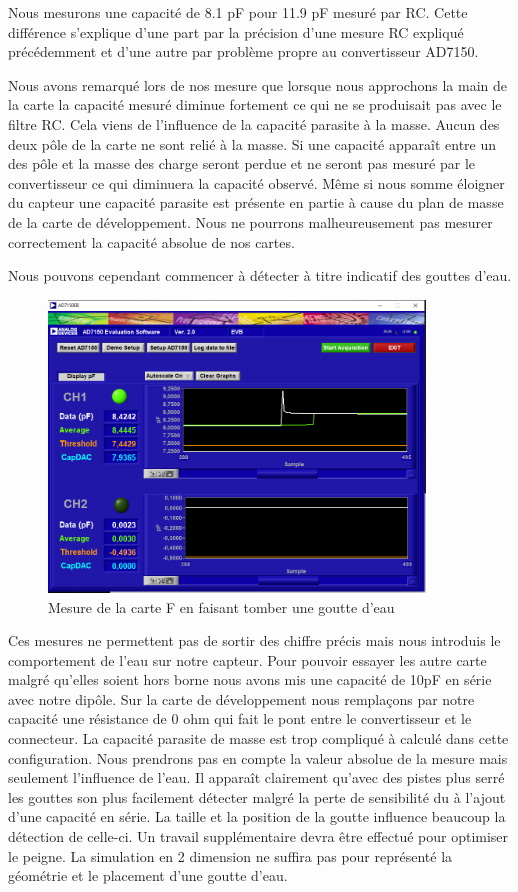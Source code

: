 Nous mesurons une capacité de 8.1 pF pour 11.9 pF mesuré par RC. Cette différence s'explique d'une part par la précision d'une mesure RC expliqué précédemment et d'une autre par problème propre au convertisseur AD7150. 

Nous avons remarqué lors de nos mesure que lorsque nous approchons la main de la carte la capacité mesuré diminue fortement ce qui ne se produisait pas avec le filtre RC. Cela viens de l’influence de la capacité parasite à la masse. Aucun des deux pôle de la carte ne sont relié à la masse. Si une capacité apparaît entre un des pôle et la masse des charge seront perdue et ne seront pas mesuré par le convertisseur ce qui diminuera la capacité observé. Même si nous somme éloigner du capteur une capacité parasite est présente en partie à cause du plan de masse de la carte de développement. Nous ne pourrons malheureusement pas mesurer correctement la capacité absolue de nos cartes. 

Nous pouvons cependant commencer à détecter à titre indicatif des gouttes d'eau. 

\begin{figure}[!ht]
\centering
 \includegraphics[width=10cm]{fadeau.png}
 \caption{Mesure de la carte F en faisant tomber une goutte d'eau}
\end{figure}

\newpage
Ces mesures ne permettent pas de sortir des chiffre précis mais nous introduis le comportement de l'eau sur notre capteur. Pour pouvoir essayer les autre carte malgré qu'elles soient hors borne nous avons mis une capacité de 10pF en série avec notre dipôle. Sur la carte de développement nous remplaçons par notre capacité une résistance de 0 ohm qui fait le pont entre le convertisseur et le connecteur. La capacité parasite de masse est trop compliqué à calculé dans cette configuration. Nous prendrons pas en compte la valeur absolue de la mesure mais seulement l’influence de l'eau. Il apparaît clairement qu'avec des pistes plus serré les gouttes son plus facilement détecter malgré la perte de sensibilité du à l'ajout d'une capacité en série. 
La taille et la position de la goutte influence beaucoup la détection de celle-ci. Un travail supplémentaire devra être effectué pour optimiser le peigne. La simulation en 2 dimension ne suffira pas pour représenté la géométrie et le placement d'une goutte d'eau.

